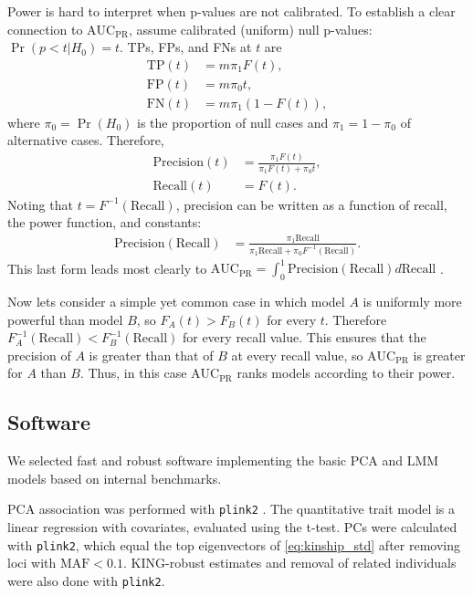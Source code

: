 \documentclass[11pt]{article}
\newcommand{\auc}{\text{AUC}_\text{PR}}
\begin{document}
Power is hard to interpret when p-values are not calibrated.
To establish a clear connection to $\auc$, assume calibrated (uniform) null p-values: $\Pr( p < t | H_0 ) = t$.
TPs, FPs, and FNs at $t$ are
\begin{align*}
  \text{TP}(t)
  &=
    m \pi_1 F(t)
    , \\
  \text{FP}(t)
  &=
    m \pi_0 t
    , \\
  \text{FN}(t)
  &=
    m \pi_1 ( 1 - F(t) )
    ,
\end{align*}
where $\pi_0 = \Pr( H_0 )$ is the proportion of null cases and $\pi_1 = 1 - \pi_0$ of alternative cases.
Therefore, 
\begin{align*}
  \text{Precision}(t)
  &=
    \frac{ \pi_1 F(t) }{ \pi_1 F(t) + \pi_0 t }
    , \\
  \text{Recall}(t)
  &=
    F(t)
    .
\end{align*}
Noting that $t = F^{-1}( \text{Recall} )$, precision can be written as a function of recall, the power function, and constants:
\begin{align*}
  \text{Precision}( \text{Recall} )
  &=
    \frac{ \pi_1 \text{Recall} }{ \pi_1 \text{Recall} + \pi_0 F^{-1}( \text{Recall} ) }
    .
\end{align*}
This last form leads most clearly to
$
\auc
=
\int_0^1 \text{Precision}( \text{Recall} ) d \text{Recall}
$
.

Now lets consider a simple yet common case in which model $A$ is uniformly more powerful than model $B$, so $F_A(t) > F_B(t)$ for every $t$.
Therefore $F_A^{-1}( \text{Recall} ) < F_B^{-1}( \text{Recall} )$ for every recall value.
This ensures that the precision of $A$ is greater than that of $B$ at every recall value, so $\auc$ is greater for $A$ than $B$.
Thus, in this case $\auc$ ranks models according to their power.

\subsection{Software}

We selected fast and robust software implementing the basic PCA and LMM models based on internal benchmarks.

PCA association was performed with \texttt{plink2} \citep{chang_second-generation_2015}.
The quantitative trait model is a linear regression with covariates, evaluated using the t-test.
PCs were calculated with \texttt{plink2}, which equal the top eigenvectors of \cref{eq:kinship_std} after removing loci with $\text{MAF} < 0.1$.
KING-robust estimates and removal of related individuals were also done with \texttt{plink2}.
\end{document}
